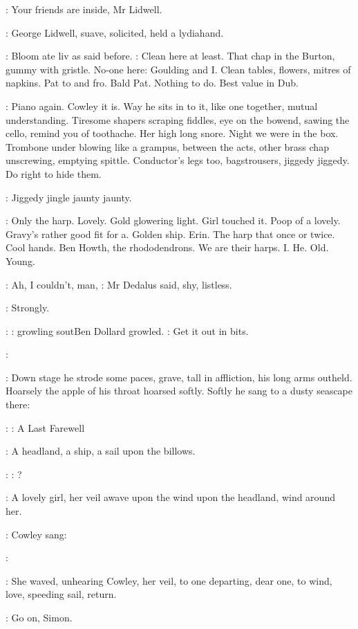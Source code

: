 \MissD:
Your friends are inside, Mr Lidwell.

:
George Lidwell, suave, solicited, held a lydiahand.

:
Bloom ate liv as said before.
\BloomInt:
Clean here at least. That chap in the
Burton, gummy with gristle.
No-one here: Goulding and I. Clean tables,
flowers, mitres of napkins. Pat to and fro. Bald Pat. Nothing to do. Best
value in Dub.

\BloomInt:
Piano again. Cowley it is. Way he sits in to it, like one together,
mutual understanding. Tiresome shapers scraping fiddles, eye on the
bowend, sawing the cello, remind you of toothache. Her high long snore.
Night we were in the box. Trombone under blowing like a grampus,
between the acts, other brass chap unscrewing, emptying spittle.
Conductor's legs too, bagstrousers, jiggedy jiggedy. Do right to hide
them.

:
Jiggedy jingle jaunty jaunty.

\BloomInt:
Only the harp. Lovely. Gold glowering light. Girl touched it.
Poop of
a lovely. Gravy's rather good fit for a. Golden ship. Erin. The harp that
once or twice. Cool hands. Ben Howth, the rhododendrons. We are their
harps. I. He. Old. Young.

\Simon:
Ah, I couldn't, man,
:
Mr Dedalus said, shy, listless.

:
Strongly.

\Dollard:
 \Stage:
growling
sout{Ben Dollard growled.}
\Dollard:
Get it out in bits.

\Cowley:

:
Down stage he strode some paces, grave, tall in affliction, his long
arms outheld. Hoarsely the apple of his throat hoarsed softly. Softly he
sang to a dusty seascape there:

\Simon:
\Song:
A Last Farewell

:
A headland, a ship, a
sail upon the billows.

\Simon:
\Stage:
?

:
A lovely girl, her veil awave upon the
wind upon the headland, wind around her.

:
Cowley sang:

\Cowley:

:
She waved, unhearing Cowley, her veil, to one departing, dear one, to
wind, love, speeding sail, return.

\Dollard:
Go on, Simon.


